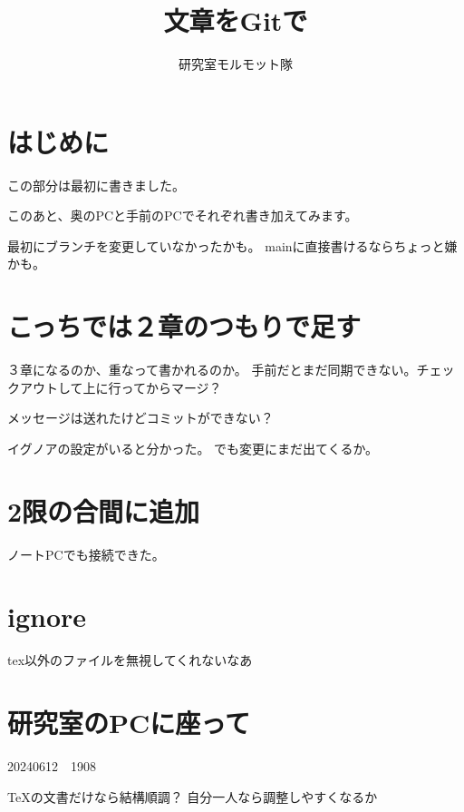 \documentclass[a4j]{ujarticle}
\title{文章をGitで}
\author{研究室モルモット隊}
\begin{document}
\maketitle
\tableofcontents

\section{はじめに}
この部分は最初に書きました。

このあと、奥のPCと手前のPCでそれぞれ書き加えてみます。

最初にブランチを変更していなかったかも。
mainに直接書けるならちょっと嫌かも。

\section{こっちでは２章のつもりで足す}
３章になるのか、重なって書かれるのか。
手前だとまだ同期できない。チェックアウトして上に行ってからマージ？

メッセージは送れたけどコミットができない？

イグノアの設定がいると分かった。
でも変更にまだ出てくるか。

\section{2限の合間に追加}
ノートPCでも接続できた。

\section{ignore}
tex以外のファイルを無視してくれないなあ

\section{研究室のPCに座って}
20240612　1908

\TeX の文書だけなら結構順調？
自分一人なら調整しやすくなるか
\end{document}
